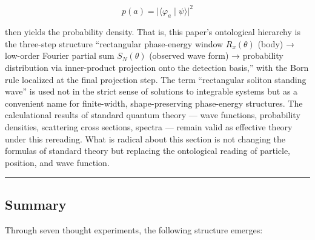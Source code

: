\documentclass[
]{article}
\begin{document}
\[
p(a) = \lvert\langle \varphi_a \mid \psi \rangle\rvert^2
\]

then yields the probability density. That is, this paper's ontological
hierarchy is the three-step structure ``rectangular phase-energy window
\(R_x(\theta)\) (body) → low-order Fourier partial sum \(S_N(\theta)\)
(observed wave form) → probability distribution via inner-product
projection onto the detection basis,'' with the Born rule localized at
the final projection step. The term ``rectangular soliton standing
wave'' is used not in the strict sense of solutions to integrable
systems but as a convenient name for finite-width, shape-preserving
phase-energy structures. The calculational results of standard quantum
theory --- wave functions, probability densities, scattering cross
sections, spectra --- remain valid as effective theory under this
rereading. What is radical about this section is not changing the
formulas of standard theory but replacing the ontological reading of
particle, position, and wave function.

\begin{center}\rule{0.5\linewidth}{0.5pt}\end{center}

\subsection{Summary}\label{summary}

Through seven thought experiments, the following structure emerges:
\end{document}
